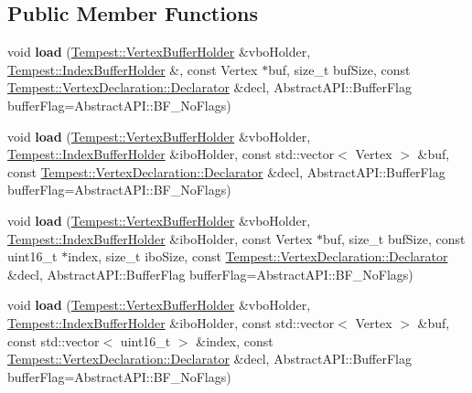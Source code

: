 \subsection*{Public Member Functions}
\begin{DoxyCompactItemize}
\item 
\hypertarget{class_tempest_1_1_model_a458bbce3012425791096999a08110620}{void {\bfseries load} (\hyperlink{class_tempest_1_1_vertex_buffer_holder}{Tempest\+::\+Vertex\+Buffer\+Holder} \&vbo\+Holder, \hyperlink{class_tempest_1_1_index_buffer_holder}{Tempest\+::\+Index\+Buffer\+Holder} \&, const Vertex $\ast$buf, size\+\_\+t buf\+Size, const \hyperlink{class_tempest_1_1_vertex_declaration_1_1_declarator}{Tempest\+::\+Vertex\+Declaration\+::\+Declarator} \&decl, Abstract\+A\+P\+I\+::\+Buffer\+Flag buffer\+Flag=Abstract\+A\+P\+I\+::\+B\+F\+\_\+\+No\+Flags)}\label{class_tempest_1_1_model_a458bbce3012425791096999a08110620}

\item 
\hypertarget{class_tempest_1_1_model_ab50eff71acf87f2066f88b54cdc58980}{void {\bfseries load} (\hyperlink{class_tempest_1_1_vertex_buffer_holder}{Tempest\+::\+Vertex\+Buffer\+Holder} \&vbo\+Holder, \hyperlink{class_tempest_1_1_index_buffer_holder}{Tempest\+::\+Index\+Buffer\+Holder} \&ibo\+Holder, const std\+::vector$<$ Vertex $>$ \&buf, const \hyperlink{class_tempest_1_1_vertex_declaration_1_1_declarator}{Tempest\+::\+Vertex\+Declaration\+::\+Declarator} \&decl, Abstract\+A\+P\+I\+::\+Buffer\+Flag buffer\+Flag=Abstract\+A\+P\+I\+::\+B\+F\+\_\+\+No\+Flags)}\label{class_tempest_1_1_model_ab50eff71acf87f2066f88b54cdc58980}

\item 
\hypertarget{class_tempest_1_1_model_acbfce05d4cd570aac5f43cc751630326}{void {\bfseries load} (\hyperlink{class_tempest_1_1_vertex_buffer_holder}{Tempest\+::\+Vertex\+Buffer\+Holder} \&vbo\+Holder, \hyperlink{class_tempest_1_1_index_buffer_holder}{Tempest\+::\+Index\+Buffer\+Holder} \&ibo\+Holder, const Vertex $\ast$buf, size\+\_\+t buf\+Size, const uint16\+\_\+t $\ast$index, size\+\_\+t ibo\+Size, const \hyperlink{class_tempest_1_1_vertex_declaration_1_1_declarator}{Tempest\+::\+Vertex\+Declaration\+::\+Declarator} \&decl, Abstract\+A\+P\+I\+::\+Buffer\+Flag buffer\+Flag=Abstract\+A\+P\+I\+::\+B\+F\+\_\+\+No\+Flags)}\label{class_tempest_1_1_model_acbfce05d4cd570aac5f43cc751630326}

\item 
\hypertarget{class_tempest_1_1_model_af3fd35531e7d151de2bcb5db961b79ca}{void {\bfseries load} (\hyperlink{class_tempest_1_1_vertex_buffer_holder}{Tempest\+::\+Vertex\+Buffer\+Holder} \&vbo\+Holder, \hyperlink{class_tempest_1_1_index_buffer_holder}{Tempest\+::\+Index\+Buffer\+Holder} \&ibo\+Holder, const std\+::vector$<$ Vertex $>$ \&buf, const std\+::vector$<$ uint16\+\_\+t $>$ \&index, const \hyperlink{class_tempest_1_1_vertex_declaration_1_1_declarator}{Tempest\+::\+Vertex\+Declaration\+::\+Declarator} \&decl, Abstract\+A\+P\+I\+::\+Buffer\+Flag buffer\+Flag=Abstract\+A\+P\+I\+::\+B\+F\+\_\+\+No\+Flags)}\label{class_tempest_1_1_model_af3fd35531e7d151de2bcb5db961b79ca}


\end{DoxyCompactItemize}
